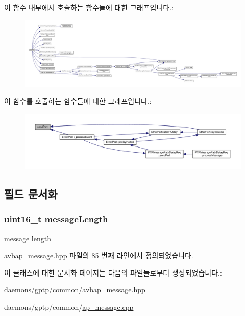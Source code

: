 이 함수 내부에서 호출하는 함수들에 대한 그래프입니다.\+:
\nopagebreak
\begin{figure}[H]
\begin{center}
\leavevmode
\includegraphics[width=350pt]{class_a_p_message_test_status_ac5f42348a1173af6a28f40d24eae897a_cgraph}
\end{center}
\end{figure}




이 함수를 호출하는 함수들에 대한 그래프입니다.\+:
\nopagebreak
\begin{figure}[H]
\begin{center}
\leavevmode
\includegraphics[width=350pt]{class_a_p_message_test_status_ac5f42348a1173af6a28f40d24eae897a_icgraph}
\end{center}
\end{figure}




\subsection{필드 문서화}
\subsubsection[{\texorpdfstring{message\+Length}{messageLength}}]{\setlength{\rightskip}{0pt plus 5cm}uint16\+\_\+t message\+Length\hspace{0.3cm}{\ttfamily [private]}}\hypertarget{class_a_p_message_test_status_a6c490faee54bca860c4d897aae50990f}{}\label{class_a_p_message_test_status_a6c490faee54bca860c4d897aae50990f}
message length 

avbap\+\_\+message.\+hpp 파일의 85 번째 라인에서 정의되었습니다.



이 클래스에 대한 문서화 페이지는 다음의 파일들로부터 생성되었습니다.\+:\begin{DoxyCompactItemize}
\item 
daemons/gptp/common/\hyperlink{avbap__message_8hpp}{avbap\+\_\+message.\+hpp}\item 
daemons/gptp/common/\hyperlink{ap__message_8cpp}{ap\+\_\+message.\+cpp}\end{DoxyCompactItemize}
